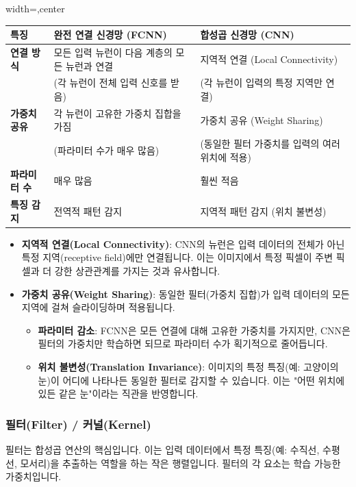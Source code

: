 \documentclass[11pt,a4paper]{article}
\theoremstyle{definition}
\begin{document}
\begin{adjustbox}{width=\textwidth,center}
\begin{tabular}{lll}
\toprule
\textbf{특징} & \textbf{완전 연결 신경망 (FCNN)} & \textbf{합성곱 신경망 (CNN)} \\
\midrule
\textbf{연결 방식} & 모든 입력 뉴런이 다음 계층의 모든 뉴런과 연결 & 지역적 연결 (Local Connectivity) \\
& (각 뉴런이 전체 입력 신호를 받음) & (각 뉴런이 입력의 특정 지역만 연결) \\
\textbf{가중치 공유} & 각 뉴런이 고유한 가중치 집합을 가짐 & 가중치 공유 (Weight Sharing) \\
& (파라미터 수가 매우 많음) & (동일한 필터 가중치를 입력의 여러 위치에 적용) \\
\textbf{파라미터 수} & 매우 많음 & 훨씬 적음 \\
\textbf{특징 감지} & 전역적 패턴 감지 & 지역적 패턴 감지 (위치 불변성) \\
\bottomrule
\end{tabular}
\end{adjustbox}

\begin{itemize}
    \item \textbf{지역적 연결(Local Connectivity)}: CNN의 뉴런은 입력 데이터의 전체가 아닌 특정 지역(receptive field)에만 연결됩니다. 이는 이미지에서 특정 픽셀이 주변 픽셀과 더 강한 상관관계를 가지는 것과 유사합니다.
    \item \textbf{가중치 공유(Weight Sharing)}: 동일한 필터(가중치 집합)가 입력 데이터의 모든 지역에 걸쳐 슬라이딩하며 적용됩니다.
        \begin{itemize}
            \item \textbf{파라미터 감소}: FCNN은 모든 연결에 대해 고유한 가중치를 가지지만, CNN은 필터의 가중치만 학습하면 되므로 파라미터 수가 획기적으로 줄어듭니다.
            \item \textbf{위치 불변성(Translation Invariance)}: 이미지의 특정 특징(예: 고양이의 눈)이 어디에 나타나든 동일한 필터로 감지할 수 있습니다. 이는 "어떤 위치에 있든 같은 눈"이라는 직관을 반영합니다.
        \end{itemize}
\end{itemize}

\subsubsection{필터(Filter) / 커널(Kernel)}
필터는 합성곱 연산의 핵심입니다. 이는 입력 데이터에서 특정 특징(예: 수직선, 수평선, 모서리)을 추출하는 역할을 하는 작은 행렬입니다. 필터의 각 요소는 학습 가능한 가중치입니다.
\end{document}
